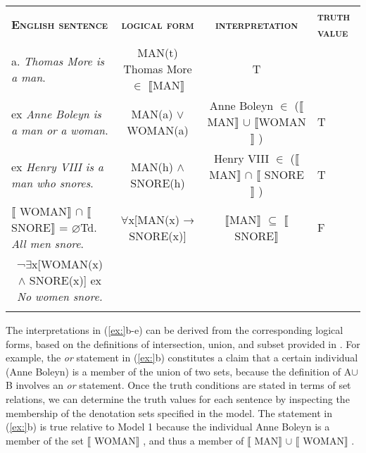 \begin{tabularx}{\textwidth}{XXXXXX}
\lsptoprule

\bfseries\scshape English sentence & \multicolumn{2}{c}{\bfseries\scshape logical form} & \multicolumn{2}{c}{\bfseries\scshape interpretation} & \bfseries\scshape truth value\\

a. \textit{Thomas More is a man}. & \multicolumn{2}{c}{MAN(t)
\newline
Thomas More ${\in}$ \textsc{$\llbracket$}MAN$\rrbracket$ } & \multicolumn{2}{c}{ T} & \\

ex \textit{Anne Boleyn is} \textit{a man or} \textit{a woman}. & \multicolumn{2}{c}{MAN(a) $\vee$ WOMAN(a)} & \multicolumn{2}{c}{Anne Boleyn ${\in}$
\newline
(\textsc{$\llbracket$}MAN$\rrbracket$  ${\cup}$ \textsc{$\llbracket$}WOMAN$\rrbracket$ )} & T\\

ex \textit{Henry VIII is a man who snores}. & \multicolumn{2}{c}{MAN(h) $\wedge$ \textsc{SNORE}(h)} & \multicolumn{2}{c}{Henry VIII ${\in}$ (\textsc{$\llbracket$}MAN$\rrbracket$  ${\cap}$ \textsc{$\llbracket$ SNORE}$\rrbracket$ )} & T\\

 \textsc{$\llbracket$ WO}MAN$\rrbracket$  ${\cap}$ \textsc{$\llbracket$ SNORE}$\rrbracket$  = ⌀Td. \textit{All men snore}.& \multicolumn{2}{c}{${\forall}$x[MAN(x) → \textsc{SNORE}(x)]} & \multicolumn{2}{c}{\textsc{$\llbracket$}MAN$\rrbracket$  ${\subseteq}$ \textsc{$\llbracket$ SNORE}$\rrbracket$ } & F\\
 
\multicolumn{1}{c}{¬${\exists}$x[WOMAN(x) $\wedge$ \textsc{SNORE}(x)]
\newline
ex \textit{No women snore.}} &  & \multicolumn{2}{c}{} & \multicolumn{2}{c}{}\\
\lspbottomrule
\end{tabularx}

The interpretations in (\ref{ex:}b-e) can be derived from the corresponding logical forms, based on the definitions of intersection, union, and subset provided in . For example, the \textit{or} statement in (\ref{ex:}b) constitutes a claim that a certain individual (Anne Boleyn) is a member of the union of two sets, because the definition of A${\cup}$B involves an \textit{or} statement. Once the truth conditions are stated in terms of set relations, we can determine the truth values for each sentence by inspecting the membership of the denotation sets specified in the model. The statement in (\ref{ex:}b) is true relative to Model 1 because the individual Anne Boleyn is a member of the set $\llbracket$ WOMAN$\rrbracket$ , and thus a member of $\llbracket$ MAN$\rrbracket$  ${\cup}$ $\llbracket$ WOMAN$\rrbracket$ .


